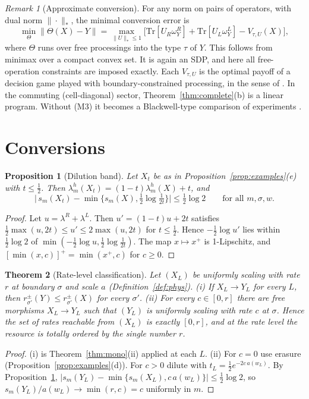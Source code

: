 \documentclass[11pt]{article}
\newtheorem{theorem}{Theorem}
\newtheorem{proposition}[theorem]{Proposition}
\theoremstyle{definition}
\theoremstyle{remark}
\newtheorem{remark}{Remark}
\newcommand{\Tr}{\mathrm{Tr}}
\begin{document}
\begin{remark}[Approximate conversion]\label{rem:robust}
For any norm on pairs of operators, with dual norm $\|\cdot\|_*$, the minimal conversion error is
\[
\min_{\Theta}\|\Theta(X)-Y\|=\max_{\|U\|_*\le1}\bigl[\Tr[U_R\omega^R_Y]+\Tr[U_L\omega^L_Y]-V_{\tau,U}(X)\bigr],
\]
where $\Theta$ runs over free processings into the type $\tau$ of $Y$. This follows from minimax over a compact convex set. It is again an SDP, and here all free-operation constraints are imposed exactly. Each $V_{\tau,U}$ is the optimal payoff of a decision game played with boundary-constrained processing, in the sense of \cite{TR19,Gour17}. In the commuting (cell-diagonal) sector, Theorem~\ref{thm:complete}(b) is a linear program. Without (M3) it becomes a Blackwell-type comparison of experiments \cite{Bla53,Bus12}.
\end{remark}

\section{Conversions}
\label{sec:conv}

\begin{proposition}[Dilution band]\label{prop:dil}
Let $X_t$ be as in Proposition~\ref{prop:examples}(e) with $t\le\frac12$. Then $\lambda^h_m(X_t)=(1-t)\lambda^h_m(X)+t$, and
\[
\bigl|\,s_m(X_t)-\min\{s_m(X),\tfrac12\log\tfrac1{2t}\}\bigr|\le\tfrac12\log2\qquad\text{for all }m,\sigma,w.
\]
\end{proposition}
\begin{proof}
Let $u=\lambda^R+\lambda^L$. Then $u'=(1-t)u+2t$ satisfies $\frac12\max(u,2t)\le u'\le2\max(u,2t)$ for $t\le\frac12$. Hence $-\frac12\log u'$ lies within $\frac12\log2$ of $\min(-\frac12\log u,\frac12\log\frac1{2t})$. The map $x\mapsto x^+$ is 1-Lipschitz, and $[\min(x,c)]^+=\min(x^+,c)$ for $c\ge0$.
\end{proof}

\begin{theorem}[Rate-level classification]\label{thm:rate}
Let $(X_L)$ be uniformly scaling with rate $r$ at boundary $\sigma$ and scale $a$ (Definition~\ref{def:phys}).
(i) If $X_L\to Y_L$ for every $L$, then $r^\pm_{\sigma'}(Y)\le r^\pm_{\sigma'}(X)$ for every $\sigma'$.
(ii) For every $c\in[0,r]$ there are free morphisms $X_L\to Y_L$ such that $(Y_L)$ is uniformly scaling with rate $c$ at $\sigma$.
Hence the set of rates reachable from $(X_L)$ is exactly $[0,r]$, and at the rate level the resource is totally ordered by the single number $r$.
\end{theorem}
\begin{proof}
(i) is Theorem~\ref{thm:mono}(ii) applied at each $L$. (ii) For $c=0$ use erasure (Proposition~\ref{prop:examples}(d)). For $c>0$ dilute with $t_L=\frac12e^{-2c\,a(w_L)}$. By Proposition~\ref{prop:dil}, $|s_m(Y_L)-\min\{s_m(X_L),c\,a(w_L)\}|\le\frac12\log2$, so $s_m(Y_L)/a(w_L)\to\min(r,c)=c$ uniformly in $m$.
\end{proof}
\end{document}
